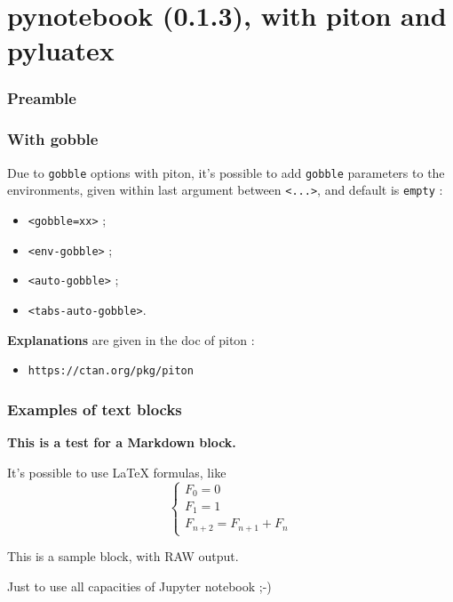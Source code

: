 \documentclass[a4paper,11pt]{article}
\def\PLver{0.1.3}
\begin{document}
\part*{pynotebook (\PLver), with piton and pyluatex}

\section{Preamble}


\section{With gobble}

Due to \texttt{gobble} options with \textsf{piton}, it's possible to add \texttt{gobble} parameters to the environments, given within last argument between \texttt{<...>}, and default is \texttt{empty} :

\begin{itemize}
	\item \texttt{<gobble=xx>} ;
	\item \texttt{<env-gobble>} ;
	\item \texttt{<auto-gobble>} ;
	\item \texttt{<tabs-auto-gobble>}.
\end{itemize}

\noindent{}\textbf{Explanations} are given in the doc of \textsf{piton} :

\begin{itemize}
	\item \texttt{https://ctan.org/pkg/piton}
\end{itemize}

\section{Examples of text blocks}

\begin{codehigh}
\begin{NotebookPitonMarkdown}{\linewidth}
{\Large\bfseries This is a test for a \textsf{Markdown} block.}

It's possible to use \LaTeX{} formulas, like %
\[
  \left\lbrace\begin{array}{l}
    F_0 = 0\\
    F_1 = 1 \\
    F_{n+2} = F_{n+1} + F_n
  \end{array}\right.
\]
\end{NotebookPitonMarkdown}

\begin{NotebookPitonRaw}{\linewidth}
This is a sample block, with RAW output.

Just to use all capacities of Jupyter notebook ;-)
\end{NotebookPitonRaw}
\end{codehigh}
\end{document}
